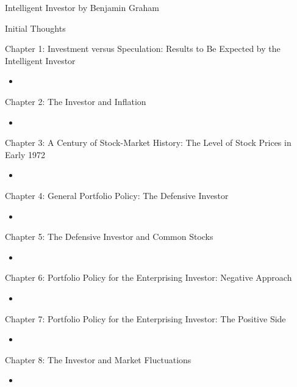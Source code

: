 \documentclass{article}
\begin{document}
\Huge Intelligent Investor by Benjamin Graham

\hrulefill

\Large Initial Thoughts

\large
\begin{quotation}

\end{quotation}

\hrulefill

\Large Chapter 1: Investment versus Speculation: Results to Be Expected by the Intelligent Investor
\begin{itemize}
	\item
\end{itemize}

\Large Chapter 2: The Investor and Inflation
\begin{itemize}
	\item
\end{itemize}

\Large Chapter 3: A Century of Stock-Market History: The Level of Stock Prices in Early 1972
\begin{itemize}
	\item
\end{itemize}

\Large Chapter 4: General Portfolio Policy: The Defensive Investor
\begin{itemize}
	\item
\end{itemize}

\Large Chapter 5: The Defensive Investor and Common Stocks
\begin{itemize}
	\item
\end{itemize}

\Large Chapter 6: Portfolio Policy for the Enterprising Investor: Negative Approach
\begin{itemize}
	\item
\end{itemize}

\Large Chapter 7: Portfolio Policy for the Enterprising Investor: The Positive Side
\begin{itemize}
	\item
\end{itemize}

\Large Chapter 8: The Investor and Market Fluctuations
\begin{itemize}
	\item
\end{itemize}
\end{document}
